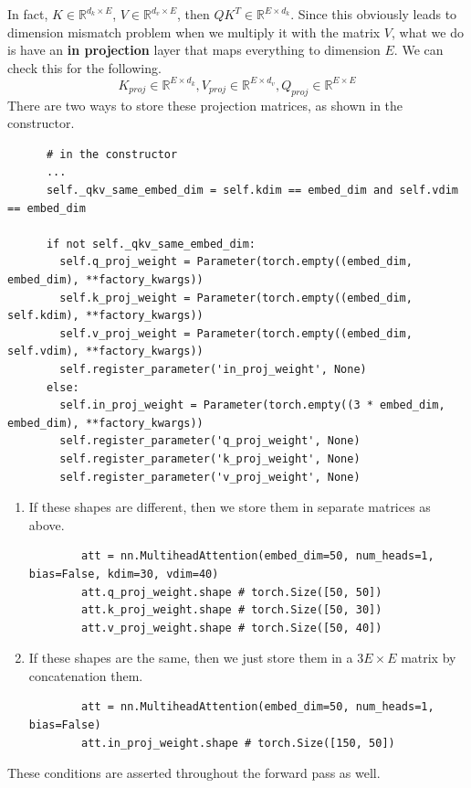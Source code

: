 \documentclass{article}
\begin{document}
    In fact, $K \in \mathbb{R}^{d_k \times E}$, $V \in \mathbb{R}^{d_v \times E}$, then $QK^T \in \mathbb{R}^{E \times d_k}$. Since this obviously leads to dimension mismatch problem when we multiply it with the matrix $V$, what we do is have an \textbf{in projection} layer that maps everything to dimension $E$. We can check this for the following. 
    \begin{equation}
      K_{proj} \in \mathbb{R}^{E \times d_k}, V_{proj} \in \mathbb{R}^{E \times d_v}, Q_{proj} \in \mathbb{R}^{E \times E}
    \end{equation}
    There are two ways to store these projection matrices, as shown in the constructor. 
    \begin{lstlisting}
      # in the constructor 
      ...
      self._qkv_same_embed_dim = self.kdim == embed_dim and self.vdim == embed_dim

      if not self._qkv_same_embed_dim:
        self.q_proj_weight = Parameter(torch.empty((embed_dim, embed_dim), **factory_kwargs))
        self.k_proj_weight = Parameter(torch.empty((embed_dim, self.kdim), **factory_kwargs))
        self.v_proj_weight = Parameter(torch.empty((embed_dim, self.vdim), **factory_kwargs))
        self.register_parameter('in_proj_weight', None)
      else:
        self.in_proj_weight = Parameter(torch.empty((3 * embed_dim, embed_dim), **factory_kwargs))
        self.register_parameter('q_proj_weight', None)
        self.register_parameter('k_proj_weight', None)
        self.register_parameter('v_proj_weight', None)
    \end{lstlisting}
    \begin{enumerate}
      \item If these shapes are different, then we store them in separate matrices as above. 
      \begin{lstlisting}
        att = nn.MultiheadAttention(embed_dim=50, num_heads=1, bias=False, kdim=30, vdim=40) 
        att.q_proj_weight.shape # torch.Size([50, 50])
        att.k_proj_weight.shape # torch.Size([50, 30])
        att.v_proj_weight.shape # torch.Size([50, 40])
      \end{lstlisting}

      \item If these shapes are the same, then we just store them in a $3E \times E$ matrix by concatenation them. 
      \begin{lstlisting}
        att = nn.MultiheadAttention(embed_dim=50, num_heads=1, bias=False) 
        att.in_proj_weight.shape # torch.Size([150, 50])
      \end{lstlisting}
    \end{enumerate}
    These conditions are asserted throughout the forward pass as well.  
\end{document}
